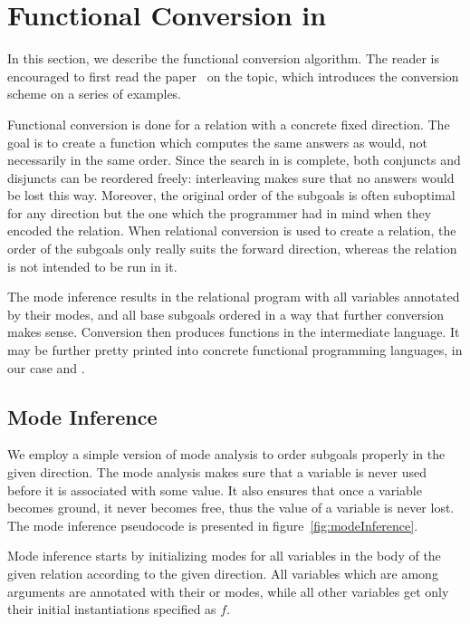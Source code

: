 \section{Functional Conversion in \mk}

In this section, we describe the functional conversion algorithm.
The reader is encouraged to first read the paper~\cite{verbitskaia2022direction} on the topic, which introduces the conversion scheme on a series of examples.

Functional conversion is done for a relation with a concrete fixed direction.
The goal is to create a function which computes the same answers as \mk would, not necessarily in the same order.
Since the search in \mk is complete, both conjuncts and disjuncts can be reordered freely: interleaving makes sure that no answers would be lost this way.
Moreover, the original order of the subgoals is often suboptimal for any direction but the one which the programmer had in mind when they encoded the relation.
When relational conversion is used to create a relation, the order of the subgoals only really suits the forward direction, whereas the relation is not intended to be run in it.

The mode inference results in the relational program with all variables annotated by their modes, and all base subgoals ordered in a way that further conversion makes sense.
Conversion then produces functions in the intermediate language.
It may be further pretty printed into concrete functional programming languages, in our case \haskell and \ocaml.


\subsection{Mode Inference}

We employ a simple version of mode analysis to order subgoals properly in the given direction.
The mode analysis makes sure that a variable is never used before it is associated with some value.
It also ensures that once a variable becomes ground, it never becomes free, thus the value of a variable is never lost.
The mode inference pseudocode is presented in figure~\ref{fig:modeInference}.



Mode inference starts by initializing modes for all variables in the body of the given relation according to the given direction.
All variables which are among arguments are annotated with their \inm or \outm modes, while all other variables get only their initial instantiations specified as $f$.

